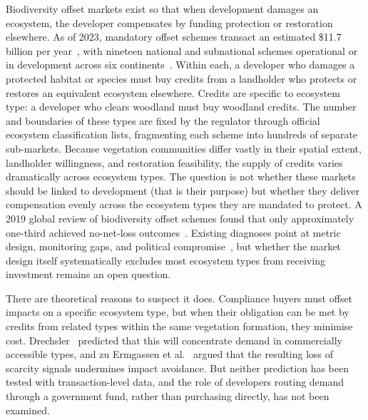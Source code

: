 \documentclass[pdflatex,sn-nature,oneside]{sn-jnl}
\begin{document}
Biodiversity offset markets exist so that when development damages an ecosystem,
the developer compensates by funding protection or restoration elsewhere.
As of 2023, mandatory offset schemes transact an estimated \$11.7 billion per
year~\cite{UNEP2023}, with nineteen national and subnational schemes operational
or in development across six continents~\cite{IAPB2024}.
Within each, a developer who damages a protected habitat or species must buy
credits from a landholder who protects or restores an equivalent ecosystem
elsewhere.
Credits are specific to ecosystem type: a developer who clears woodland
must buy woodland credits. The number and boundaries of these types are
fixed by the regulator through official ecosystem classification lists,
fragmenting each scheme into hundreds of separate sub-markets.
Because vegetation communities differ vastly in their spatial extent, landholder
willingness, and restoration feasibility, the supply of credits varies
dramatically across ecosystem types.
The question is not whether these markets should be linked to development
(that is their purpose) but whether they deliver
compensation evenly across the ecosystem types they are mandated to protect.
A 2019 global review of biodiversity offset schemes found that only
approximately one-third achieved no-net-loss outcomes~\cite{zuErmgassen2019}.
Existing diagnoses point at metric design, monitoring gaps, and political
compromise~\cite{Maron2016}, but whether the market design itself
systematically excludes most ecosystem types from receiving investment
remains an open question.

There are theoretical reasons to suspect it does.
Compliance buyers must offset impacts on a specific ecosystem type, but when
their obligation can be met by credits from related types within the same
vegetation formation, they minimise cost.
Drechsler~\cite{Drechsler2024} predicted that this will concentrate demand in
commercially accessible types, and zu Ermgassen et al.~\cite{zuErmgassen2020}
argued that the resulting loss of scarcity signals undermines impact avoidance.
But neither prediction has been tested with transaction-level data, and the
role of developers routing demand through a government fund, rather than
purchasing directly, has not been examined.
\end{document}
